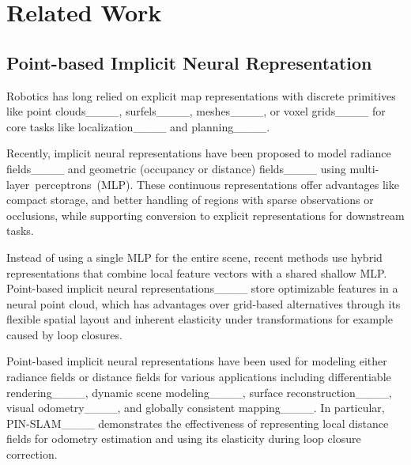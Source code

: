 \section{Related Work}
\label{sec:related}



\subsection{Point-based Implicit Neural Representation}


Robotics has long relied on explicit map representations with discrete primitives like point clouds____, surfels____, meshes____, or voxel grids____ for core tasks like localization____ and planning____.
%

Recently, implicit neural representations have been proposed to model radiance fields____ and geometric (occupancy or distance) fields____ using \mbox{multi-layer perceptrons (MLP)}. 
%
These continuous representations offer advantages like compact storage, and better handling of regions with sparse observations or occlusions, while supporting conversion to explicit representations for downstream tasks.
%

Instead of using a single MLP for the entire scene, recent methods use hybrid representations that combine local feature vectors with a shared shallow MLP.
Point-based implicit neural representations____ store optimizable features in a neural point cloud, which has advantages over grid-based alternatives through its flexible spatial layout and inherent elasticity under transformations for example caused by loop closures.
%

%
Point-based implicit neural representations have been used for modeling either radiance fields or distance fields for various applications including differentiable rendering____, dynamic scene modeling____, surface reconstruction____, visual odometry____, and globally consistent mapping____. 
%
In particular, PIN-SLAM____ demonstrates the effectiveness of representing local distance fields for odometry estimation and using its elasticity during loop closure correction.
%

